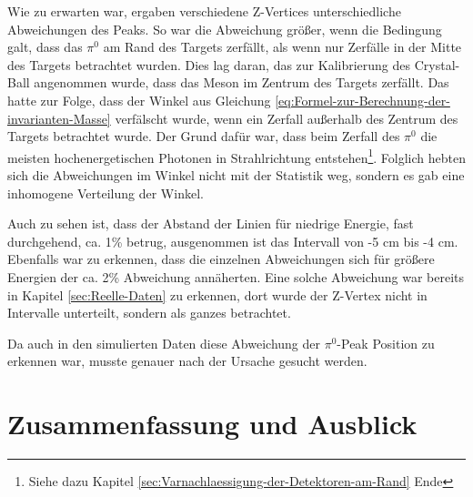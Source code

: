 \documentclass[a4paper,11pt,oneside,final,german,openbib,pdftex]{scrbook}
\begin{document}
{Wie zu erwarten war, ergaben verschiedene Z-Vertices unterschiedliche Abweichungen des Peaks. So war die Abweichung gr\"o{\ss}er, wenn die Bedingung galt, dass das $\pi^0$ am Rand des Targets zerf\"allt, als wenn nur Zerf\"alle in der Mitte des Targets betrachtet wurden. Dies lag daran, das zur Kalibrierung des Crystal-Ball angenommen wurde, dass das Meson im Zentrum des Targets zerf\"allt. Das hatte zur Folge, dass der Winkel aus Gleichung \ref{eq:Formel-zur-Berechnung-der-invarianten-Masse} verf\"alscht wurde, wenn ein Zerfall au{\ss}erhalb des Zentrum des Targets betrachtet wurde. Der Grund daf\"ur war, dass beim Zerfall des $\pi^0$ die meisten hochenergetischen Photonen in Strahlrichtung entstehen\footnote{Siehe dazu Kapitel \ref{sec:Varnachlaessigung-der-Detektoren-am-Rand} Ende}. Folglich hebten sich die Abweichungen im Winkel nicht mit der Statistik weg, sondern es gab eine inhomogene Verteilung der Winkel. 
  
Auch zu sehen ist, dass der Abstand der Linien f\"ur niedrige Energie, fast durchgehend, ca. 1\% betrug, ausgenommen ist das Intervall von -5 cm bis -4 cm. Ebenfalls war zu erkennen, dass die einzelnen Abweichungen sich f\"ur gr\"o{\ss}ere Energien der ca. 2\% Abweichung ann\"aherten. Eine solche Abweichung war bereits in Kapitel \ref{sec:Reelle-Daten} zu erkennen, dort wurde der Z-Vertex nicht in Intervalle unterteilt, sondern als ganzes betrachtet.

Da auch in den simulierten Daten diese Abweichung der $\pi^0$-Peak Position zu erkennen war, musste genauer nach der Ursache gesucht werden.


\chapter{Zusammenfassung und Ausblick}


\begin{appendix}

\end{appendix}}
\end{document}
